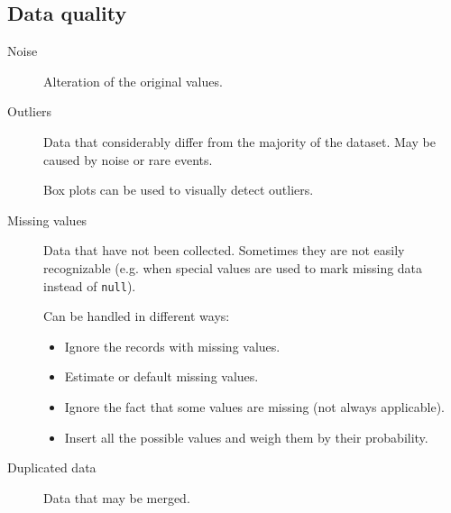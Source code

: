 \subsection{Data quality}
\begin{description}
    \item[Noise] 
        Alteration of the original values.

    \item[Outliers] 
        Data that considerably differ from the majority of the dataset.
        May be caused by noise or rare events.

        Box plots can be used to visually detect outliers.

    \item[Missing values] 
        Data that have not been collected.
        Sometimes they are not easily recognizable 
        (e.g. when special values are used to mark missing data instead of \texttt{null}).

        Can be handled in different ways:
        \begin{itemize}
            \item Ignore the records with missing values.
            \item Estimate or default missing values.
            \item Ignore the fact that some values are missing (not always applicable).
            \item Insert all the possible values and weigh them by their probability.
        \end{itemize}

    \item[Duplicated data] 
        Data that may be merged.
\end{description}